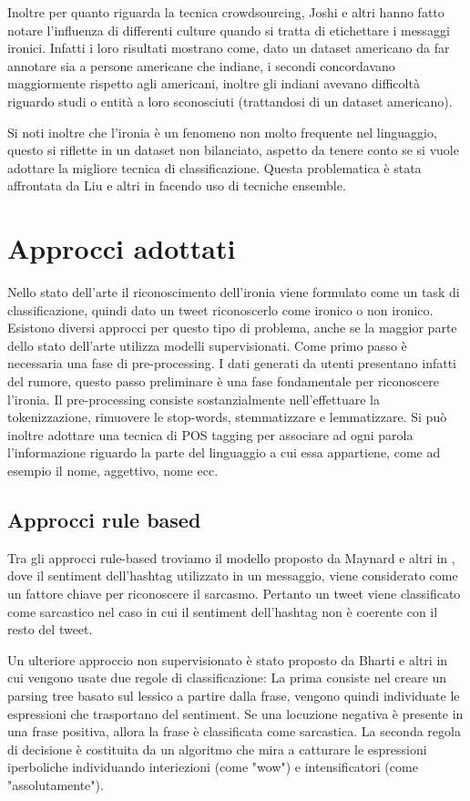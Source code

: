 \documentclass[oneside]{book}
\begin{document}
Inoltre per quanto riguarda la tecnica crowdsourcing, Joshi e altri \cite{survey5} hanno fatto notare l'influenza di differenti culture quando si tratta di etichettare i messaggi ironici. Infatti i loro risultati mostrano come, dato un dataset americano da far annotare sia a persone americane che indiane, i secondi concordavano maggiormente rispetto agli americani, inoltre gli indiani avevano difficoltà riguardo studi o entità a loro sconosciuti (trattandosi di un dataset americano).

Si noti inoltre che l'ironia è un fenomeno non molto frequente nel linguaggio, questo si riflette in un dataset non bilanciato, aspetto da tenere conto se si vuole adottare la migliore tecnica di classificazione. Questa problematica è stata affrontata da Liu e altri in \cite{imbalance} facendo uso di tecniche ensemble.


\section{Approcci adottati}
Nello stato dell'arte il riconoscimento dell'ironia viene formulato come un task di classificazione, quindi dato un tweet riconoscerlo come ironico o non ironico. Esistono  diversi approcci per questo tipo di problema, anche se la maggior parte dello stato dell'arte utilizza modelli supervisionati. Come primo passo è necessaria una fase di pre-processing. I dati generati da utenti presentano infatti del rumore, questo passo preliminare è una fase fondamentale per riconoscere l'ironia. Il pre-processing consiste sostanzialmente nell'effettuare la tokenizzazione, rimuovere le stop-words, stemmatizzare e lemmatizzare. Si può inoltre adottare una tecnica di POS tagging per associare ad ogni parola l'informazione riguardo la parte del linguaggio a cui essa appartiene, come ad esempio il nome, aggettivo, nome ecc.

\subsection{Approcci rule based}
Tra gli approcci rule-based troviamo il modello proposto da Maynard e altri in \cite{hashtag}, dove il sentiment dell'hashtag utilizzato in un messaggio, viene considerato come un fattore chiave per riconoscere il sarcasmo. Pertanto un tweet viene classificato come sarcastico nel caso in cui il sentiment dell'hashtag non è coerente con il resto del tweet.

Un ulteriore approccio non supervisionato è stato proposto da Bharti e altri \cite{parsing-tree} in cui vengono usate due regole di classificazione:
La prima consiste nel creare un parsing tree basato sul lessico a partire dalla frase, vengono quindi individuate le espressioni che trasportano del sentiment. Se una locuzione negativa è presente in una frase positiva, allora la frase è classificata come sarcastica. La seconda regola di decisione è costituita da un algoritmo che mira a catturare le espressioni iperboliche individuando interiezioni (come "wow") e intensificatori (come "assolutamente").
\end{document}
